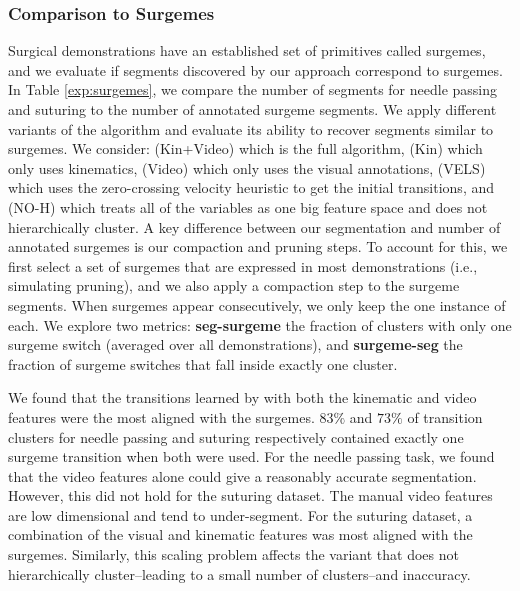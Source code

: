 \subsubsection{Comparison to Surgemes}
Surgical demonstrations have an established set of primitives called surgemes, and we evaluate if segments discovered by our approach correspond to surgemes. 
In Table \ref{exp:surgemes}, we compare the number of \tsc segments for needle passing and suturing to the number of annotated surgeme segments.
We apply different variants of the \tsc algorithm and evaluate its ability to recover segments similar to surgemes.
We consider: (Kin+Video) which is the full \tsc algorithm, (Kin) which only uses kinematics, (Video) which only uses the visual annotations, (VELS) which uses the zero-crossing velocity heuristic to get the initial transitions, and (NO-H) which treats all of the variables as one big feature space and does not hierarchically cluster.
A key difference between our segmentation and number of annotated surgemes is our compaction and pruning steps.
To account for this, we first select a set of surgemes that are expressed in most demonstrations (i.e., simulating pruning), and we also apply a compaction step to the surgeme segments.
When surgemes appear consecutively, we only keep the one instance of each.
We explore two metrics: \textbf{seg-surgeme} the fraction of \tsc clusters with only one surgeme switch (averaged over all demonstrations), and \textbf{surgeme-seg} the fraction of surgeme switches that fall inside exactly one \tsc cluster.

 We found that the transitions learned by \tsc with both the kinematic and video features were the most aligned with the surgemes. 
 $83\%$ and $73\%$ of transition clusters for needle passing and suturing respectively contained exactly one surgeme transition when both were used.
 For the needle passing task, we found that the video features alone could give a reasonably accurate segmentation.
 However, this did not hold for the suturing dataset.
 The manual video features are low dimensional and tend to under-segment.
 For the suturing dataset, a combination of the visual and kinematic features was most aligned with the surgemes.
 Similarly, this scaling problem affects the variant that does not hierarchically cluster--leading to a small number of clusters--and inaccuracy.
 
 
 
 






